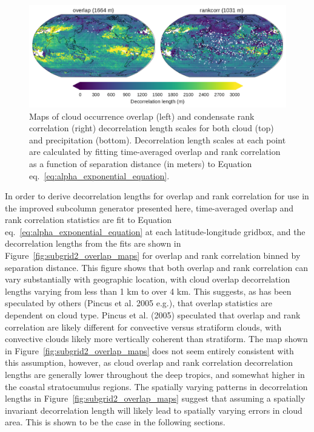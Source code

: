 \begin{figure}[htbp]
\centering
\includegraphics{graphics/subgrid2_overlap_maps.pdf}
\caption{\label{fig:subgrid2_overlap_maps}Maps of cloud occurrence
overlap (left) and condensate rank correlation (right) decorrelation
length scales for both cloud (top) and precipitation (bottom).
Decorrelation length scales at each point are calculated by fitting
time-averaged overlap and rank correlation as a function of separation
distance (in meters) to Equation
eq.~\ref{eq:alpha_exponential_equation}.}\label{fig:subgrid2ux5foverlapux5fmaps}
\end{figure}

In order to derive decorrelation lengths for overlap and rank
correlation for use in the improved subcolumn generator presented here,
time-averaged overlap and rank correlation statistics are fit to
Equation eq.~\ref{eq:alpha_exponential_equation} at each
latitude-longitude gridbox, and the decorrelation lengths from the fits
are shown in Figure~\ref{fig:subgrid2_overlap_maps} for overlap and rank
correlation binned by separation distance. This figure shows that both
overlap and rank correlation can vary substantially with geographic
location, with cloud overlap decorrelation lengths varying from less
than 1 km to over 4 km. This suggests, as has been speculated by others
(Pincus et al. 2005 e.g.), that overlap statistics are dependent on
cloud type. Pincus et al. (2005) speculated that overlap and rank
correlation are likely different for convective versus stratiform
clouds, with convective clouds likely more vertically coherent than
stratiform. The map shown in Figure~\ref{fig:subgrid2_overlap_maps} does
not seem entirely consistent with this assumption, however, as cloud
overlap and rank correlation decorrelation lengths are generally lower
throughout the deep tropics, and somewhat higher in the coastal
stratocumulus regions. The spatially varying patterns in decorrelation
lengths in Figure~\ref{fig:subgrid2_overlap_maps} suggest that assuming
a spatially invariant decorrelation length will likely lead to spatially
varying errors in cloud area. This is shown to be the case in the
following sections.

